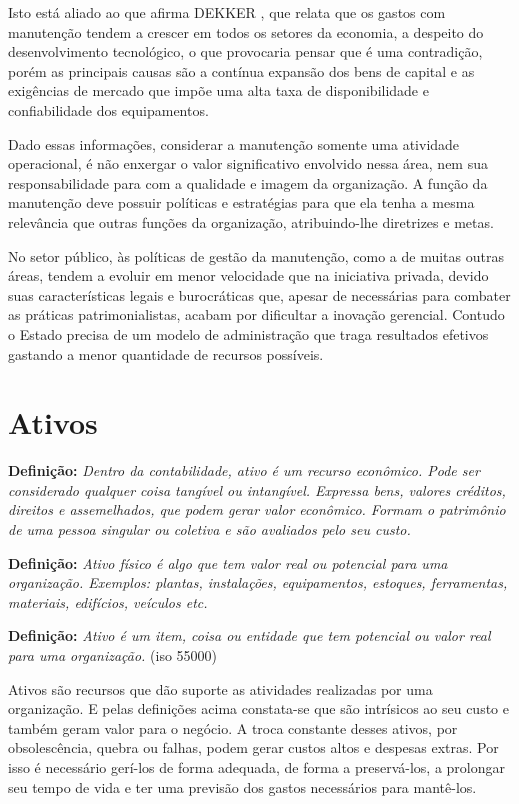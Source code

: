 Isto está aliado ao que afirma DEKKER \cite{dekker1998}, que relata que os gastos com manutenção tendem a crescer em todos os setores da economia, a despeito do desenvolvimento tecnológico, o que provocaria pensar que é uma contradição, porém as principais causas são a contínua expansão dos bens de capital e as exigências de mercado que impõe uma alta taxa de disponibilidade e confiabilidade dos equipamentos.

Dado essas informações, considerar a manutenção somente uma atividade operacional, é não enxergar o valor significativo envolvido nessa área, nem sua responsabilidade para com a qualidade e imagem da organização. A função da manutenção deve possuir políticas e estratégias para que ela tenha a mesma relevância que outras funções da organização, atribuindo-lhe diretrizes e metas.	

No setor público, às políticas de gestão da manutenção, como a de muitas outras áreas, tendem a evoluir em menor velocidade que na iniciativa privada, devido suas características legais e burocráticas que, apesar de necessárias para combater as práticas patrimonialistas, acabam por dificultar a inovação gerencial. Contudo o Estado precisa de um modelo de administração que traga resultados efetivos gastando a menor quantidade de recursos possíveis.


\section{Ativos}

\textbf{Definição:} \emph{Dentro da contabilidade, ativo é um recurso econômico. Pode ser considerado qualquer coisa tangível ou intangível. Expressa bens, valores créditos, direitos e assemelhados, que podem gerar valor econômico. Formam o patrimônio de uma pessoa singular ou coletiva e são avaliados pelo seu custo.} \cite{sullivan2003}\cite{fulgencio2007} 

\textbf{Definição:} \emph{Ativo físico é algo que tem valor real ou potencial para uma organização.
Exemplos: plantas, instalações, equipamentos, estoques, ferramentas, materiais, edifícios, veículos etc.} \cite{nicolay2015}

\textbf{Definição:} \emph{Ativo é um item, coisa ou entidade que tem potencial ou valor real para uma organização.} (iso 55000)

Ativos são recursos que dão suporte as atividades realizadas por uma organização. E pelas definições acima constata-se que são intrísicos ao seu custo e também geram valor para o negócio. A troca constante desses ativos, por obsolescência, quebra ou falhas, podem gerar custos altos e despesas extras. Por isso é necessário gerí-los de forma adequada, de forma a preservá-los, a prolongar seu tempo de vida e ter uma previsão dos gastos necessários para mantê-los. 

